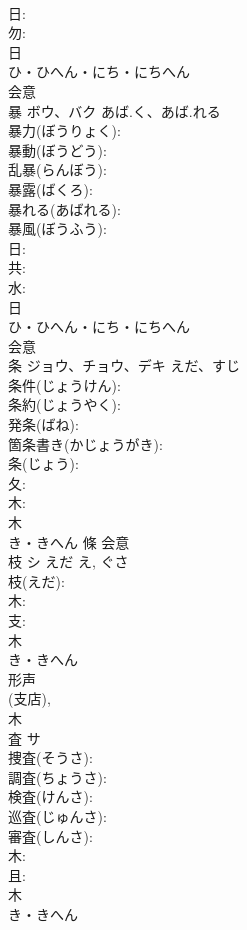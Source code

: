\documentclass[8pt]{extreport}
\begin{document}
\begin{CJK}{UTF8}{min}
\\	日: 
\\	勿: 
\\	日	
\\	ひ・ひへん・にち・にちへん	
\\	会意 
\\	暴	ボウ、バク	あば.く、あば.れる		
\\	暴力(ぼうりょく): 
\\	暴動(ぼうどう): 
\\	乱暴(らんぼう): 
\\	暴露(ばくろ): 
\\	暴れる(あばれる): 
\\	暴風(ぼうふう): 
\\	日: 
\\	共: 
\\	水: 
\\	日	
\\	ひ・ひへん・にち・にちへん	
\\	会意 
\\	条	ジョウ、チョウ、デキ	えだ、すじ		
\\	条件(じょうけん): 
\\	条約(じょうやく): 
\\	発条(ばね): 
\\	箇条書き(かじょうがき): 
\\	条(じょう): 
\\	夂: 
\\	木: 
\\	木	
\\	き・きへん	條	会意 
\\	枝	シ	えだ	え, ぐさ	
\\	枝(えだ): 
\\	木: 
\\	支: 
\\	木	
\\	き・きへん	
\\	形声 
\\	(支店), 
\\	木 
\\	査	サ			
\\	捜査(そうさ): 
\\	調査(ちょうさ): 
\\	検査(けんさ): 
\\	巡査(じゅんさ): 
\\	審査(しんさ): 
\\	木: 
\\	且: 
\\	木	
\\	き・きへん	

\end{CJK}
\end{document}

